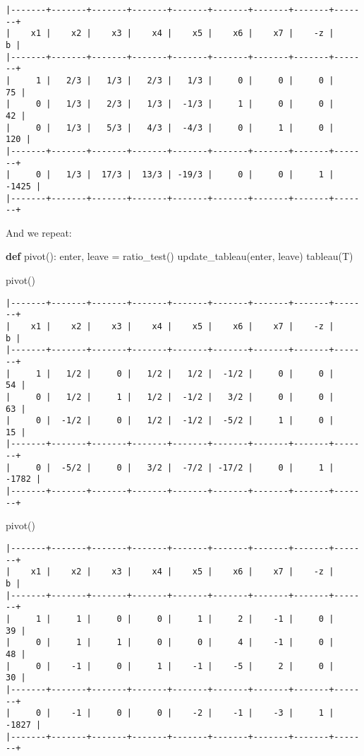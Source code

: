\documentclass[
  letterpaper,
  DIV=11,
  numbers=noendperiod]{scrartcl}
\newenvironment{Shaded}{\begin{snugshade}}{\end{snugshade}}
\newcommand{\KeywordTok}[1]{\textcolor[rgb]{0.00,0.23,0.31}{\textbf{#1}}}
\newcommand{\NormalTok}[1]{\textcolor[rgb]{0.00,0.23,0.31}{#1}}
\newcommand{\OperatorTok}[1]{\textcolor[rgb]{0.37,0.37,0.37}{#1}}
\begin{document}
\begin{verbatim}
|-------+-------+-------+-------+-------+-------+-------+-------+-------+
|    x1 |    x2 |    x3 |    x4 |    x5 |    x6 |    x7 |    -z |     b |
|-------+-------+-------+-------+-------+-------+-------+-------+-------+
|     1 |   2/3 |   1/3 |   2/3 |   1/3 |     0 |     0 |     0 |    75 |
|     0 |   1/3 |   2/3 |   1/3 |  -1/3 |     1 |     0 |     0 |    42 |
|     0 |   1/3 |   5/3 |   4/3 |  -4/3 |     0 |     1 |     0 |   120 |
|-------+-------+-------+-------+-------+-------+-------+-------+-------+
|     0 |   1/3 |  17/3 |  13/3 | -19/3 |     0 |     0 |     1 | -1425 |
|-------+-------+-------+-------+-------+-------+-------+-------+-------+
\end{verbatim}

And we repeat:

\begin{Shaded}
\begin{Highlighting}[]
\KeywordTok{def}\NormalTok{ pivot():}
\NormalTok{    enter, leave }\OperatorTok{=}\NormalTok{ ratio\_test()}
\NormalTok{    update\_tableau(enter, leave)}
\NormalTok{    tableau(T)}

\NormalTok{pivot()}
\end{Highlighting}
\end{Shaded}

\begin{verbatim}
|-------+-------+-------+-------+-------+-------+-------+-------+-------+
|    x1 |    x2 |    x3 |    x4 |    x5 |    x6 |    x7 |    -z |     b |
|-------+-------+-------+-------+-------+-------+-------+-------+-------+
|     1 |   1/2 |     0 |   1/2 |   1/2 |  -1/2 |     0 |     0 |    54 |
|     0 |   1/2 |     1 |   1/2 |  -1/2 |   3/2 |     0 |     0 |    63 |
|     0 |  -1/2 |     0 |   1/2 |  -1/2 |  -5/2 |     1 |     0 |    15 |
|-------+-------+-------+-------+-------+-------+-------+-------+-------+
|     0 |  -5/2 |     0 |   3/2 |  -7/2 | -17/2 |     0 |     1 | -1782 |
|-------+-------+-------+-------+-------+-------+-------+-------+-------+
\end{verbatim}

\begin{Shaded}
\begin{Highlighting}[]
\NormalTok{pivot()}
\end{Highlighting}
\end{Shaded}

\begin{verbatim}
|-------+-------+-------+-------+-------+-------+-------+-------+-------+
|    x1 |    x2 |    x3 |    x4 |    x5 |    x6 |    x7 |    -z |     b |
|-------+-------+-------+-------+-------+-------+-------+-------+-------+
|     1 |     1 |     0 |     0 |     1 |     2 |    -1 |     0 |    39 |
|     0 |     1 |     1 |     0 |     0 |     4 |    -1 |     0 |    48 |
|     0 |    -1 |     0 |     1 |    -1 |    -5 |     2 |     0 |    30 |
|-------+-------+-------+-------+-------+-------+-------+-------+-------+
|     0 |    -1 |     0 |     0 |    -2 |    -1 |    -3 |     1 | -1827 |
|-------+-------+-------+-------+-------+-------+-------+-------+-------+
\end{verbatim}
\end{document}
